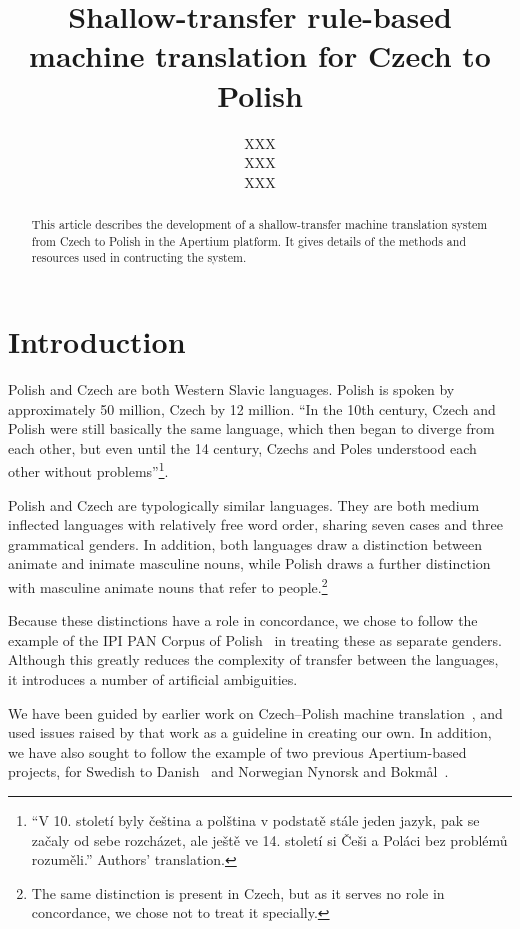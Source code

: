 \documentclass[11pt]{article}
\title{Shallow-transfer rule-based machine translation for Czech to Polish}
\author{XXX\\
  XXX \\
  XXX \\
}
\date{}
\begin{document}
\maketitle

\begin{abstract}
This article describes the development of a shallow-transfer machine translation
system from Czech to Polish in the Apertium platform. It gives details of the
methods and resources used in contructing the system. 
\end{abstract}

\section{Introduction}

Polish and Czech are both Western Slavic languages. Polish is spoken by
approximately 50 million, Czech by 12 million.
``In the 10th century, Czech and Polish were still basically the same language, 
which then began to diverge from each other, but even until the 14 century, 
Czechs and Poles understood each other without problems''\footnote{``V 10. 
století byly čeština a polština v podstatě stále jeden jazyk, pak se začaly 
od sebe rozcházet, ale ještě ve 14. století si Češi a Poláci bez problémů rozuměli.''
Authors' translation.}.~\citep{wiki:polstina}

Polish and Czech are typologically similar languages. They are both medium inflected 
languages with relatively free word order, sharing seven cases and three grammatical 
genders. In addition, both languages draw a distinction between animate and inimate 
masculine nouns, while Polish draws a further distinction with masculine animate 
nouns that refer to people.\footnote{The same distinction is present in Czech, but
as it serves no role in concordance, we chose not to treat it specially.}

Because these distinctions have a role in concordance, we chose to 
follow the example of the IPI PAN Corpus of Polish~\citep{prze:04ce} in treating these 
as separate genders. Although this greatly reduces the complexity of transfer between 
the languages, it introduces a number of artificial ambiguities.

We have been guided by earlier work on Czech--Polish machine translation~\citep{Debowski02}, 
and used issues raised by that work as a guideline in creating our own. In addition, we 
have also sought to follow the example of two previous Apertium-based projects, for Swedish to 
Danish~\citep{tyers2009rfr} and Norwegian Nynorsk and Bokm{\aa}l~\citep{unhammer2009rfr}.
\end{document}
